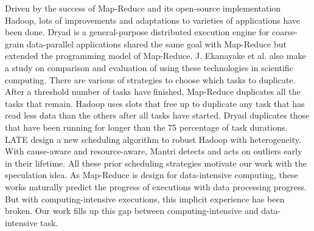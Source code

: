 Driven by the success of Map-Reduce \cite{dean} and its open-source implementation Hadoop, lots of improvements \cite{Zaharia:2008:IMP:1855741.1855744} \cite{Ananthanarayanan:2010:ROM:1924943.1924962} and adaptations \cite{Srirama:2012:ASC:2304777.2304882}  \cite{4811889} \cite{Ekanayake:2008:MDI:1488725.1488926} to varieties of applications have been done. Dryad \cite{Isard:2007:DDD:1272998.1273005} is a general-purpose distributed execution engine for coarse-grain data-parallel applications shared the same goal with Map-Reduce but extended the programming model of Map-Reduce. J. Ekanayake et al. \cite{5611496} \cite{Ekanayake:2009:DSA:1723206.1724844} also make a study on comparison and evaluation of using these technologies in scientific computing. There are various of strategies to choose which tasks to duplicate. After a threshold number of tasks havefinished, Map-Reduce duplicates all the tasks that remain. Hadoop uses slots that free up to duplicate any task that has read less data than the others after all tasks have started. Dryad duplicates those that have been running for longer than the 75 percentage of task durations. LATE \cite{Zaharia:2008:IMP:1855741.1855744} design a new scheduling algorithm to robust Hadoop with heterogeneity. With cause-aware and resource-aware, Mantri \cite{Ananthanarayanan:2010:ROM:1924943.1924962} detects and acts on outliers early in their lifetime. All these prior scheduling strategies motivate our work with the speculation idea. As Map-Reduce is design for data-intensive computing, these works naturally predict the progress of executions with data processing progress. But with computing-intensive executions, this implicit experience has been broken. Our work fills up this gap between computing-intensive and data-intensive task.


